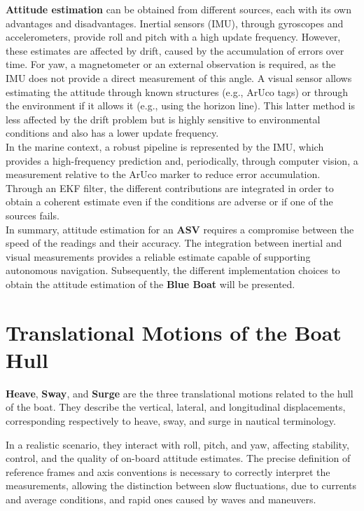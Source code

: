 \textbf{Attitude estimation} can be obtained from different sources, each with its own advantages and disadvantages. Inertial sensors (IMU)\cite{IMU_Euler}, through gyroscopes and accelerometers, provide roll and pitch with a high update frequency. However, these estimates are affected by drift, caused by the accumulation of errors over time. For yaw, a magnetometer or an external observation is required, as the IMU does not provide a direct measurement of this angle. A visual sensor allows estimating the attitude through known structures (e.g., ArUco tags) or through the environment if it allows it (e.g., using the horizon line). This latter method is less affected by the drift problem but is highly sensitive to environmental conditions and also has a lower update frequency.  
\\In the marine context, a robust pipeline is represented by the IMU, which provides a high-frequency prediction and, periodically, through computer vision, a measurement relative to the ArUco marker to reduce error accumulation. Through an EKF filter\cite{EKS_IMU_cv}, the different contributions are integrated in order to obtain a coherent estimate even if the conditions are adverse or if one of the sources fails.  
\\In summary, attitude estimation for an \textbf{ASV} requires a compromise between the speed of the readings and their accuracy. The integration between inertial and visual measurements provides a reliable estimate capable of supporting autonomous navigation. Subsequently, the different implementation choices to obtain the attitude estimation of the \textbf{Blue Boat} will be presented.

\section{Translational Motions of the Boat Hull}

\textbf{Heave}, \textbf{Sway}, and \textbf{Surge} are the three translational motions related to the hull of the boat. They describe the vertical, lateral, and longitudinal displacements, corresponding respectively to heave, sway, and surge in nautical terminology. 

In a realistic scenario, they interact with roll, pitch, and yaw, affecting stability, control, and the quality of on-board attitude estimates. The precise definition of reference frames and axis conventions is necessary to correctly interpret the measurements, allowing the distinction between slow fluctuations, due to currents and average conditions, and rapid ones caused by waves and maneuvers. 

